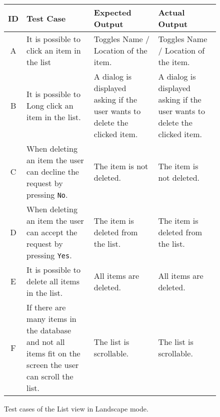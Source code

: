 \begin{figure}[H]
	\centering
	\renewcommand*{\arraystretch}{1.5} %
	\begin{tabular}{| c | p{3.5cm} | p{3.5cm} | p{3.5cm} |}
		\hline
		{\textbf{ID} } & {\textbf{Test Case} } & {\textbf{Expected Output}} & {\textbf {Actual Output}} \\\hline\hline
		A &	It is possible to click an item in the list & Toggles Name / Location of the item.  & Toggles Name / Location of the item. \\ \hline
		B & It is possible to Long click an item in the list. & A dialog is displayed asking if the user wants to delete the clicked item. & A dialog is displayed asking if the user wants to delete the clicked item. \\ \hline
		C & When deleting an item the user can decline the request by pressing \texttt{No}. & The item is not deleted. & The item is not deleted. \\ \hline
		D & When deleting an item the user can accept the request by pressing \texttt{Yes}. & The item is deleted from the list. & The item is deleted from the list. \\ \hline
		E & It is possible to delete all items in the list. & All items are deleted. & All items are deleted. \\ \hline
		F & If there are many items in the database and not all items fit on the screen the user can scroll the list. & The list is scrollable. & The list is scrollable. \\ \hline
	\end{tabular}
	
	\caption{Test cases of the List view in Landscape mode.}
	\label{tab:test-cases-list-landscape}
\end{figure}